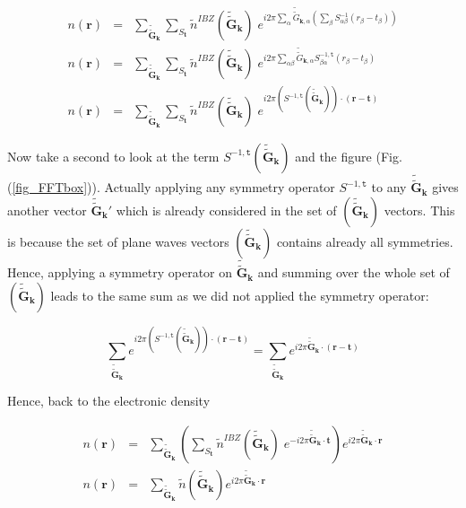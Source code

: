 \documentclass[a4paper,12pt]{report}
\begin{document}
\begin{eqnarray}
n(\mathbf{r}) &=& \sum_{\tilde{\tilde{\mathbf{G}}}_{\mathbf{k}}} \sum_{S_{\mathbf{t}}} \tilde{n}^{IBZ}(\tilde{\tilde{\mathbf{G}}}_{\mathbf{k}})\; e^{i2\pi \sum_{\alpha} \tilde{\tilde{G}}_{\mathbf{k},\alpha} \left( \sum_{\beta} S^{-1}_{\alpha\beta} (r_{\beta}-t_{\beta})\right) } \nonumber \\
n(\mathbf{r}) &=& \sum_{\tilde{\tilde{\mathbf{G}}}_{\mathbf{k}}} \sum_{S_{\mathbf{t}}} \tilde{n}^{IBZ}(\tilde{\tilde{\mathbf{G}}}_{\mathbf{k}})\; e^{i2\pi \sum_{\alpha\beta} \tilde{\tilde{G}}_{\mathbf{k},\alpha} S^{-1,{\mathtt{t}}}_{\beta\alpha} (r_{\beta}-t_{\beta}) } \nonumber \\
n(\mathbf{r}) &=& \sum_{\tilde{\tilde{\mathbf{G}}}_{\mathbf{k}}} \sum_{S_{\mathbf{t}}} \tilde{n}^{IBZ}(\tilde{\tilde{\mathbf{G}}}_{\mathbf{k}})\; e^{i2\pi \left( S^{-1,{\mathtt{t}}} (\tilde{\tilde{\mathbf{G}}}_{\mathbf{k}}) \right) \cdot (\mathbf{r}-\mathbf{t}) }
\end{eqnarray}

Now take a second to look at the term $S^{-1,{\mathtt{t}}} (\tilde{\tilde{\mathbf{G}}}_{\mathbf{k}})$ and the figure (Fig.(\ref{fig_FFTbox})). Actually applying any symmetry operator $S^{-1,{\mathtt{t}}}$ to any $\tilde{\tilde{\mathbf{G}}}_{\mathbf{k}}$ gives another vector $\tilde{\tilde{\mathbf{G}}}_{\mathbf{k}}'$ which is already considered in the set of $(\tilde{\tilde{\mathbf{G}}}_{\mathbf{k}})$ vectors. This is because the set of plane waves vectors $(\tilde{\tilde{\mathbf{G}}}_{\mathbf{k}})$ contains already all symmetries. Hence, applying a symmetry operator on $\tilde{\tilde{\mathbf{G}}}_{\mathbf{k}}$ and summing over the whole set of $(\tilde{\tilde{\mathbf{G}}}_{\mathbf{k}})$ leads to the same sum as we did not applied the symmetry operator:

\begin{equation}
\sum_{\tilde{\tilde{\mathbf{G}}}_{\mathbf{k}}} e^{i2\pi \left( S^{-1,{\mathtt{t}}} (\tilde{\tilde{\mathbf{G}}}_{\mathbf{k}}) \right) \cdot (\mathbf{r}-\mathbf{t}) } = \sum_{\tilde{\tilde{\mathbf{G}}}_{\mathbf{k}}} e^{i2\pi \tilde{\tilde{\mathbf{G}}}_{\mathbf{k}} \cdot (\mathbf{r}-\mathbf{t}) } \label{trick_tildetildeGk}
\end{equation}

Hence, back to the electronic density

\begin{eqnarray}
n(\mathbf{r}) &=& \sum_{\tilde{\tilde{\mathbf{G}}}_{\mathbf{k}}} \left( \sum_{S_{\mathbf{t}}} \tilde{n}^{IBZ}(\tilde{\tilde{\mathbf{G}}}_{\mathbf{k}})\; e^{-i2\pi \tilde{\tilde{\mathbf{G}}}_{\mathbf{k}} \cdot \mathbf{t}} \right) e^{i2\pi \tilde{\tilde{\mathbf{G}}}_{\mathbf{k}} \cdot \mathbf{r} } \nonumber \\
n(\mathbf{r}) &=& \sum_{\tilde{\tilde{\mathbf{G}}}_{\mathbf{k}}} \tilde{n}(\tilde{\tilde{\mathbf{G}}}_{\mathbf{k}}) e^{i2\pi \tilde{\tilde{\mathbf{G}}}_{\mathbf{k}} \cdot \mathbf{r} } \label{Eqntot_FFT}
\end{eqnarray}
\end{document}
